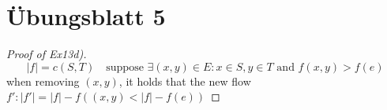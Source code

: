 \documentclass[12pt,oneside,a4paper,parskip=on,fleqn]{scrartcl}
\begin{document}
\section*{Übungsblatt 5}
	\begin{proof}[Proof of Ex13d)]
		\[
			|f| = c(S,T) \quad \text{suppose } \exists (x,y)\in E: x\in S, y\in T\text{ and } f(x,y) > f(e)
		\]
		when removing $(x,y)$, it holds that the new flow $f': |f'|=|f|-f((x,y) < |f| - f(e))$
	\end{proof}
\end{document}
